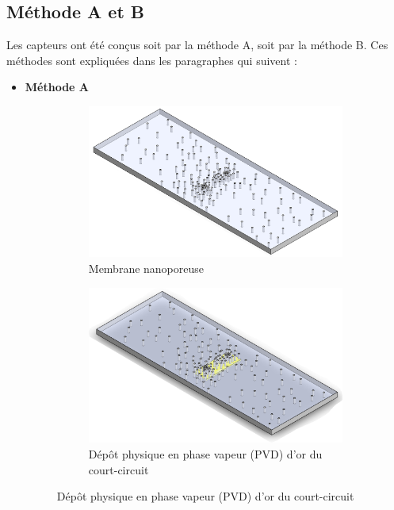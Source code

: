 \subsection{Méthode A et B}
Les capteurs ont été conçus soit par la méthode A, soit par la méthode B. Ces méthodes sont expliquées dans les paragraphes qui suivent :
\begin{itemize}
    \item \textbf{Méthode A}
          \begin{figure}[H]
              \centering
              \begin{subfigure}{0.45\textwidth}
                  \includegraphics[scale = 0.22]{assets/figures/Membrane_nue.png}
                  \caption{Membrane nanoporeuse}
              \end{subfigure}
              \begin{subfigure}{0.45\textwidth}
                  \includegraphics[scale = 0.27]{assets/figures/Court_circuit.png}
                  \caption{Dépôt physique en phase vapeur (PVD) d'or du court-circuit}

\end{subfigure}
\end{figure}
\end{itemize}
